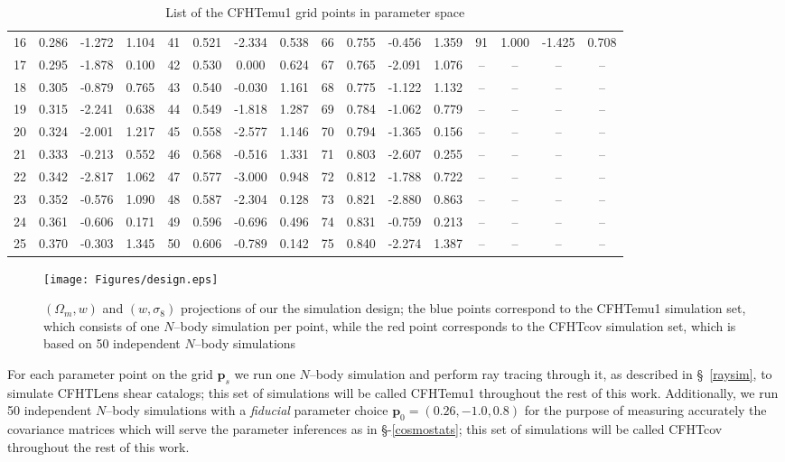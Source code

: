 \documentclass[reprint,aps,prd,superscriptaddress,showkeys]{revtex4-1}
\begin{document}
\begin{table*}
\begin{tabular}{c|ccc||c|ccc||c|ccc||c|ccc}
16 & 0.286 & -1.272 & 1.104 & 41 & 0.521 & -2.334 & 0.538 & 66 & 0.755 & -0.456 & 1.359 & 91 & 1.000 & -1.425 & 0.708 \\
17 & 0.295 & -1.878 & 0.100 & 42 & 0.530 & 0.000 & 0.624 & 67 & 0.765 & -2.091 & 1.076 & -- & -- & -- & -- \\
18 & 0.305 & -0.879 & 0.765 & 43 & 0.540 & -0.030 & 1.161 & 68 & 0.775 & -1.122 & 1.132 & -- & -- & -- & -- \\
19 & 0.315 & -2.241 & 0.638 & 44 & 0.549 & -1.818 & 1.287 & 69 & 0.784 & -1.062 & 0.779 & -- & -- & -- & -- \\
20 & 0.324 & -2.001 & 1.217 & 45 & 0.558 & -2.577 & 1.146 & 70 & 0.794 & -1.365 & 0.156 & -- & -- & -- & -- \\
21 & 0.333 & -0.213 & 0.552 & 46 & 0.568 & -0.516 & 1.331 & 71 & 0.803 & -2.607 & 0.255 & -- & -- & -- & -- \\
22 & 0.342 & -2.817 & 1.062 & 47 & 0.577 & -3.000 & 0.948 & 72 & 0.812 & -1.788 & 0.722 & -- & -- & -- & -- \\
23 & 0.352 & -0.576 & 1.090 & 48 & 0.587 & -2.304 & 0.128 & 73 & 0.821 & -2.880 & 0.863 & -- & -- & -- & -- \\
24 & 0.361 & -0.606 & 0.171 & 49 & 0.596 & -0.696 & 0.496 & 74 & 0.831 & -0.759 & 0.213 & -- & -- & -- & -- \\
25 & 0.370 & -0.303 & 1.345 & 50 & 0.606 & -0.789 & 0.142 & 75 & 0.840 & -2.274 & 1.387 & -- & -- & -- & -- \\
\end{tabular}
\caption{List of the CFHTemu1 grid points in parameter space}
\label{designtable}
\end{table*}
%
\begin{figure*}
\begin{center}
\texttt{[image: Figures/design.eps]}
\caption{$(\Omega_m,w)$ and $(w,\sigma_8)$ projections of our the simulation design; the blue points correspond to the CFHTemu1 simulation set, which consists of one $N$--body simulation per point, while the red point corresponds to the CFHTcov simulation set, which is based on 50 independent $N$--body simulations}
\label{designfig}
\end{center}
\end{figure*}
%
For each parameter point on the grid $\mathbf{p}_s$ we run one $N$--body simulation and perform ray tracing through it, as described in \S~\ref{raysim}, to simulate CFHTLens shear catalogs; this set of simulations will be called CFHTemu1 throughout the rest of this work. Additionally, we run 50 independent $N$--body simulations with a \textit{fiducial} parameter choice $\mathbf{p}_0=(0.26,-1.0,0.8)$ for the purpose of measuring accurately the covariance matrices which will serve the parameter inferences as in \S-\ref{cosmostats}; this set of simulations will be called CFHTcov throughout the rest of this work.    
\end{document}
